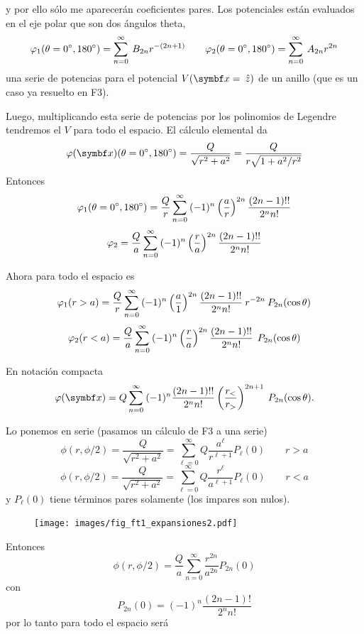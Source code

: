 \documentclass[10pt,oneside]{CBFT_book}
\begin{document}
y por ello sólo me aparecerán coeficientes pares.
Los potenciales están evaluados en el eje polar que son dos ángulos theta,
\[
	\varphi_1(\theta=0^\circ,180^\circ) = 
	\sum_{n=0}^{\infty} \: B_{2n} r^{-(2n + 1)} \qquad
	\varphi_2(\theta=0^\circ,180^\circ) = 
	\sum_{n=0}^{\infty} \: A_{2n} r^{2n}
\]
una serie de potencias para el potencial $V(\vbx = \zver)$ de un anillo (que
es un caso ya resuelto en F3).

Luego, multiplicando esta serie de potencias por los polinomios de Legendre
tendremos el $V$ para todo el espacio.
El cálculo elemental da
\[
	\vp(\vbx)(\theta=0^\circ,180^\circ) = \frac{Q}{\sqrt{r^2 + a^2}} =
	\frac{Q}{r \sqrt{1 + a^2 / r^2 }}
\]
Entonces
\[
	\varphi_1(\theta=0^\circ,180^\circ) =
	\frac{Q}{r} \sum_{n=0}^{\infty} \: (-1)^n \left( \frac{ a }{ r } \right)^{2n}
	\frac{(2n-1)!!}{2^n n!}
\]
\[
	\varphi_2 =
	\frac{Q}{a} \sum_{n=0}^{\infty} \: (-1)^n \left( \frac{ r }{ a } \right)^{2n}
	\frac{(2n-1)!!}{2^n n!}
\]

Ahora para todo el espacio es
\[
	\varphi_1(r>a) =
	\frac{Q}{r} \sum_{n=0}^{\infty} \: (-1)^n \left( \frac{ a }{ 1 } \right)^{2n}
	\frac{(2n-1)!!}{2^n n!} \: r^{-2n} \: P_{2n}( \cos\theta )
\]
\[
	\varphi_2(r<a) =
	\frac{Q}{a} \sum_{n=0}^{\infty} \: (-1)^n \left( \frac{ r }{ a } \right)^{2n}
	\frac{(2n-1)!!}{2^n n!} \: \: P_{2n}( \cos\theta )
\]

En notación compacta
\[
	\vp(\vbx) = Q \sum_{n=0}^{\infty} \: (-1)^n \frac{(2n-1)!!}{2^n n!}
	\Frac{r_<}{r_>}^{2n+1} \: P_{2n}(\cos\theta) .
\]

Lo ponemos en serie (pasamos un cálculo de F3 a una serie)
\[
	\phi(r,\phi/2) = \frac{Q}{\sqrt{r^2 + a^2}} = \sum_{\ell=0}^\infty Q \frac{a^\ell}{r^{\ell + 1}} 
	P_\ell (0) \qquad r > a
\]
\[
	\phi(r,\phi/2) = \frac{Q}{\sqrt{r^2 + a^2}} = \sum_{\ell=0}^\infty Q \frac{r^\ell}{a^{\ell + 1}} 
	P_\ell (0) \qquad r < a
\]
y $P_\ell(0)$ tiene términos pares solamente (los impares son nulos).

\begin{figure}[htb]
	\begin{center}
	\texttt{[image: images/fig\_ft1\_expansiones2.pdf]}	 
	\end{center}
	\caption{}
\end{figure} 

Entonces
\[
	\phi(r,\phi/2) = \frac{Q}{a} \sum_{n=0}^\infty \frac{r^{2n}}{a^{2n}} P_{2n} (0) 
\]
con 
\[
	P_{2n} (0) = (-1)^n \frac{(2n-1)!}{2^n n!}
\]
por lo tanto para todo el espacio será
\end{document}

